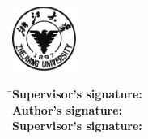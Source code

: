 
\newpage
\cleardoublepage  %
\thispagestyle{empty}

\vspace{10mm}%

\begin{center}
\xunderline[115mm]{\linespread{1.1}\xiaoer\TNR\bfseries\centerline\zjutitlee}
\ifthenelse{\equal\zjutitleeb{}}{}{\\[2mm]\xunderline[115mm]{\linespread{1.1}\xiaoer\Fangsong\bfseries\centerline\zjutitleeb}}
\ifthenelse{\equal\zjutitleec{}}{}{\\[2mm]\xunderline[115mm]{\linespread{1.1}\xiaoer\Fangsong\bfseries\centerline\zjutitleec}}
\end{center}

\vspace{5.5mm}%

\begin{center}
  \includegraphics[width=21mm]{images/zjulogo.pdf}%
\end{center}

\vspace{-3mm}%

\begin{tabbing}
\hspace{20mm} \= \sanhao\bfseries Supervisor's signature: \= \underline{\makebox[5cm]{}}\kill \\
              \> \hspace{7mm} \sanhao\bfseries Author's signature: \> \underline{\makebox[5cm]{}} \\[9mm]
              \> \sanhao\bfseries Supervisor's signature: \> \underline{\makebox[5cm]{}}
\end{tabbing}

\vspace{8mm}%

